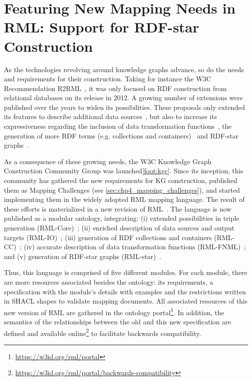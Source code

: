 \section{Featuring New Mapping Needs in RML: Support for RDF-star Construction}
\label{sec:chp4_rml_star}

As the technologies revolving around knowledge graphs advance, so do the needs and requirements for their construction. Taking for instance the W3C Recommendation R2RML~\parencite{das2012r2rml}, it was only focused on RDF construction from relational databases on its release in 2012. A growing number of extensions were published over the years to widen its possibilities. These proposals only extended its features to describe additional data sources~\parencite{DBLP:conf/webist/MichelDFM15,VanAssche2021LeveragingWebThings}, but also to increase its expressiveness regarding the inclusion of data transformation functions~\parencite{de2020implementation,debruyne2016r2rmlf,junior2016funul,kyzirakos2018geotriples}, the generation of more RDF terms (e.g. collections and containers)~\parencite{DBLP:conf/webist/MichelDFM15,debruyne2017R2RML-collections} and RDF-star graphs~\parencite{delva2021rml-star,sundqvist2022extending}. 

As a consequence of these growing needs, the W3C Knowledge Graph Construction Community Group was launched\cref{foot:kgc}. 
Since its inception, this community has gathered the new requirements for KG construction, published them as Mapping Challenges (see \cref{sec:chp4_mapping_challenges}), and started implementing them in the widely adopted RML mapping language. 
The result of these efforts is materialized in a new revision of RML~\parencite{iglesias2023rml}. 
The language is now published as a modular ontology, integrating: (i) extended possibilities in triple generation (RML-Core)~\parencite{core_ontology}; (ii) enriched description of data sources and output targets (RML-IO)~\parencite{io_ontology}; (iii) generation of RDF collections and containers (RML-CC)~\parencite{cc_ontology}; (iv) accurate description of data transformation functions (RML-FNML)~\parencite{fnml_ontology}; and (v) generation of RDF-star graphs (RML-star)~\parencite{star_ontology}.

Thus, this language is comprised of five different modules. 
For each module, there are more resources associated besides the ontology: its requirements, a specification with the module's details with examples and the restrictions written in SHACL shapes to validate mapping documents. 
All associated resources of this new version of RML are gathered in the ontology portal\footnote{\url{https://w3id.org/rml/portal}}. 
In addition, the semantics of the relationships between the old and this new specification are defined and available online\footnote{\url{https://w3id.org/rml/portal/backwards-compatibility}} to facilitate backwards compatibility.

